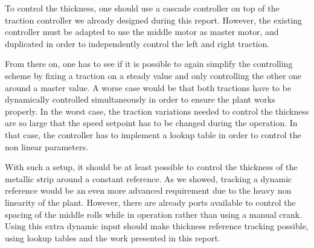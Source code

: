 To control the thickness, one should use a cascade controller on top of the traction controller we already designed during this report. However, the existing controller must be adapted to use the middle motor as master motor, and duplicated in order to independently control the left and right traction.

From there on, one has to see if it is possible to again simplify the controlling scheme by fixing a traction on a steady value and only controlling the other one around a master value. A worse case would be that both tractions have to be dynamically controlled simultaneously in order to ensure the plant works properly. In the worst case, the traction variations needed to control the thickness are so large that the speed setpoint has to be changed during the operation. In that case, the controller has to implement a lookup table in order to control the non linear parameters.

With such a setup, it should be at least possible to control the thickness of the metallic strip around a constant reference. As we showed, tracking a dynamic reference would be an even more advanced requirement due to the heavy non linearity of the plant. However, there are already ports available to control the spacing of the middle rolls while in operation rather than using a manual crank. Using this extra dynamic input should make thickness reference tracking possible, using lookup tables and the work presented in this report.
